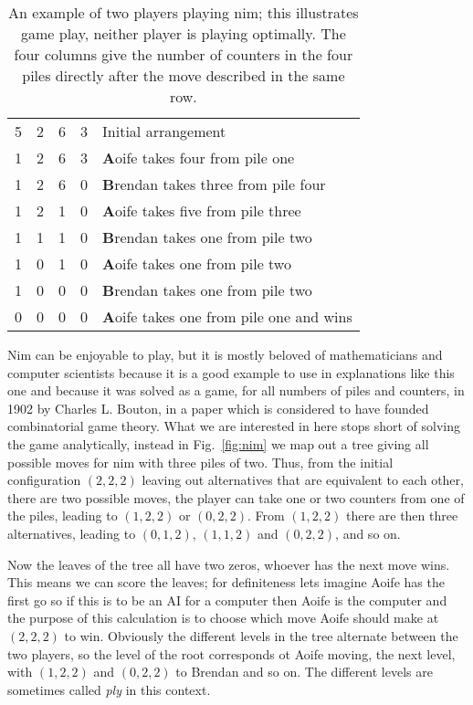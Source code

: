 \documentclass[11pt,a4paper]{scrartcl}
\begin{document}
\begin{table}
\begin{tabular}{cccc|l}
5&2&6&3&Initial arrangement\\
1&2&6&3&\textbf{A}oife takes four from pile one\\
1&2&6&0&\textbf{B}rendan takes three from pile four\\
1&2&1&0&\textbf{A}oife takes five from pile three\\
1&1&1&0&\textbf{B}rendan takes one from pile two\\
1&0&1&0&\textbf{A}oife takes one from pile two\\
1&0&0&0&\textbf{B}rendan takes one from pile two\\
0&0&0&0&\textbf{A}oife takes one from pile one and wins
\end{tabular}
\caption{An example of two players playing nim; this illustrates game play, neither player is playing optimally. The four columns give the number of counters in the four piles directly after the move described in the same row.\label{tab:nim_example}}
\end{table}

Nim can be enjoyable to play, but it is mostly beloved of
mathematicians and computer scientists because it is a good example to
use in explanations like this one and because it was solved as a game,
for all numbers of piles and counters, in 1902 by Charles L. Bouton,
in a paper which is considered to have founded combinatorial game
theory. What we are interested in here stops short of solving the game
analytically, instead in Fig.~\ref{fig:nim} we map out a tree giving
all possible moves for nim with three piles of two. Thus, from the
initial configuration $(2,2,2)$ leaving out alternatives that are
equivalent to each other, there are two possible moves, the player can
take one or two counters from one of the piles, leading to $(1,2,2)$
or $(0,2,2)$. From $(1,2,2)$ there are then three alternatives,
leading to $(0,1,2)$, $(1,1,2)$ and $(0,2,2)$, and so on.

Now the leaves of the tree all have two zeros, whoever has the next
move wins. This means we can score the leaves; for definiteness lets
imagine Aoife has the first go so if this is to be an AI for a
computer then Aoife is the computer and the purpose of this
calculation is to choose which move Aoife should make at $(2,2,2)$ to
win. Obviously the different levels in the tree alternate between the
two players, so the level of the root corresponds ot Aoife moving, the
next level, with $(1,2,2)$ and $(0,2,2)$ to Brendan and so on. The
different levels are sometimes called \textsl{ply} in this context.
\end{document}
